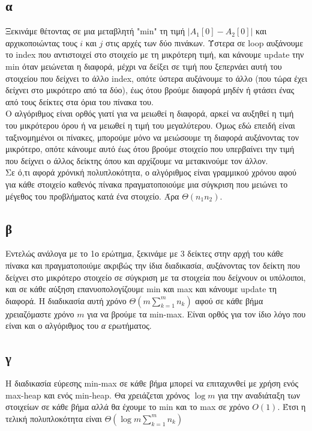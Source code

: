 \documentclass[12pt,a4paper]{article}
\begin{document}
  \subsection{α}
    Ξεκινάμε θέτοντας σε μια μεταβλητή {\latintext "min"} τη τιμή
    \(|A_{1}[0] - A_{2}[0]|\) και αρχικοποιώντας τους \(i\) και \(j\) στις
    αρχές των δύο πινάκων. Ύστερα σε {\latintext loop} αυξάνουμε το
    {\latintext index} που αντιστοιχεί στο στοιχείο με τη μικρότερη τιμή, και
    κάνουμε {\latintext update} την {\latintext min} όταν μειώνεται η διαφορά,
    μέχρι να δείξει σε τιμή που ξεπερνάει αυτή του στοιχείου που δείχνει το άλλο
    {\latintext index}, οπότε ύστερα αυξάνουμε το άλλο (που τώρα έχει δείχνει
    στο μικρότερο από τα δύο), έως ότου βρούμε διαφορά μηδέν ή φτάσει ένας
    από τους δείκτες στα όρια του πίνακα του.\\
    Ο αλγόριθμος είναι ορθός γιατί για να μειωθεί η διαφορά, αρκεί να αυξηθεί
    η τιμή του μικρότερου όρου ή να μειωθεί η τιμή του μεγαλύτερου. Όμως εδώ
    επειδή είναι ταξινομημένοι οι πίνακες, μπορούμε μόνο να μειώσουμε τη
    διαφορά αυξάνοντας τον μικρότερο, οπότε κάνουμε αυτό έως ότου βρούμε
    στοιχείο που υπερβαίνει την τιμή που δείχνει ο άλλος δείκτης όπου και
    αρχίζουμε να μετακινούμε τον άλλον.\\
    Σε ό,τι αφορά χρόνική πολυπλοκότητα, ο αλγόριθμος είναι γραμμικού χρόνου
    αφού για κάθε στοιχείο καθενός πίνακα πραγματοποιούμε μια σύγκριση που
    μειώνει το μέγεθος του προβλήματος κατά ένα στοιχείο.
    Άρα \( \Theta(n_1n_2) \).

  \subsection{β}
    Εντελώς ανάλογα με το 1ο ερώτημα, ξεκινάμε με 3 δείκτες στην αρχή του κάθε
    πίνακα και πραγματοποιύμε ακριβώς την ίδια διαδικασία, αυξάνοντας τον
    δείκτη που δείχνει στο μικρότερο στοιχείο σε σύγκριση με τα στοιχεία που
    δείχνουν οι υπόλοιποι, και σε κάθε αύξηση επανυοπολογίζουμε {\latintext
    min} και {\latintext max} και κάνουμε {\latintext update} τη διαφορά. 
    Η διαδικασία αυτή χρόνο \(\Theta(m\sum_{k=1}^{m}n_k)\) αφού σε κάθε βήμα
    χρειαζόμαστε χρόνο \(m\) για να βρούμε τα {\latintext min-max}. Είναι 
    ορθός για τον ίδιο λόγο που είναι και ο αλγόριθμος του \textit{α} ερωτήματος.
  
  \subsection{γ}
    Η διαδικασία εύρεσης {\latintext min-max} σε κάθε βήμα μπορεί να επιταχυνθεί 
    με χρήση ενός {\latintext max-heap }και ενός {\latintext min-heap}. Θα 
    χρειάζεται χρόνος \( \log{m} \) για την αναδιάταξη των στοιχείων σε κάθε 
    βήμα αλλά θα έχουμε το {\latintext min} και το {\latintext max} σε χρόνο 
    \( Ο(1) \).
    Έτσι η τελική πολυπλοκότητα είναι \(\Theta(\log{m}\sum_{k=1}^{m}n_k)\)
\end{document}

